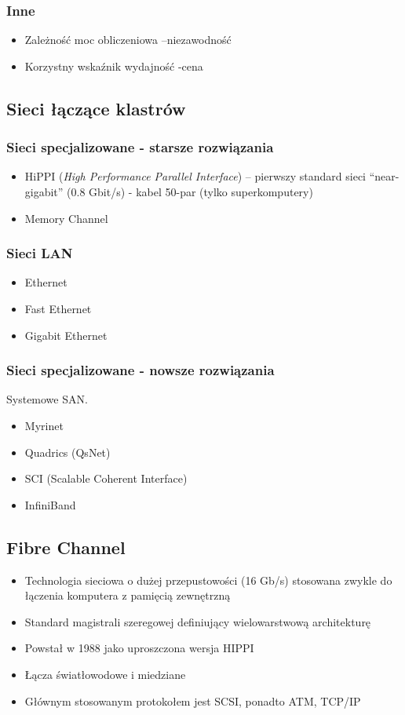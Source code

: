 		\subsubsection{Inne}
			\begin{itemize}
				\item Zależność moc obliczeniowa –niezawodność
				\item Korzystny wskaźnik wydajność -cena
			\end{itemize}
	\subsection{Sieci łączące klastrów}
		\subsubsection{Sieci specjalizowane - starsze rozwiązania}
		 	\begin{itemize}
		 		\item HiPPI (\emph{High Performance Parallel Interface}) – pierwszy standard sieci “near-gigabit” (0.8 Gbit/s) - kabel 50-par (tylko superkomputery)
		 		\item Memory Channel
		 	\end{itemize}
		\subsubsection{Sieci LAN}
			\begin{itemize}
				\item Ethernet
				\item Fast Ethernet
				\item Gigabit Ethernet
			\end{itemize}
		\subsubsection{Sieci specjalizowane - nowsze rozwiązania}
			Systemowe SAN.
			\begin{itemize}
				\item Myrinet
				\item Quadrics (QsNet)
				\item SCI (Scalable Coherent Interface)
				\item InfiniBand
			\end{itemize}
	\subsection{Fibre Channel}
		\begin{itemize}
			\item Technologia sieciowa o dużej przepustowości (16 Gb/s) stosowana zwykle do łączenia komputera z pamięcią zewnętrzną
			\item Standard magistrali szeregowej definiujący wielowarstwową architekturę
			\item Powstał w 1988 jako uproszczona wersja HIPPI
			\item Łącza światłowodowe i miedziane
			\item Głównym stosowanym protokołem jest SCSI, ponadto ATM, TCP/IP
		\end{itemize}
